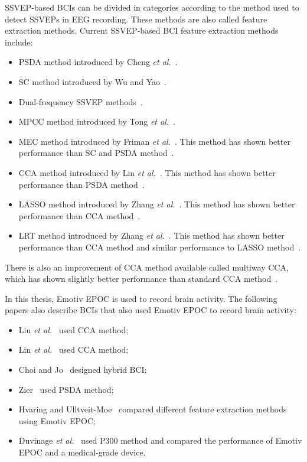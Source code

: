 \gls{SSVEP}-based \glspl{BCI} can be divided in categories according to the method used to detect \glspl{SSVEP} in \gls{EEG} recording. These methods are also called \gls{feature extraction} methods. Current \gls{SSVEP}-based \gls{BCI} \gls{feature extraction} methods include:
\begin{itemize}
	\item \Gls{PSDA} method introduced by Cheng \textit{et al.}~\cite{psda}.
	\item \Gls{SC} method introduced by Wu and Yao~\cite{sc}.
	\item Dual-frequency \gls{SSVEP} methods~\cite{dual1, dual2}.
	\item \Gls{MPCC} method introduced by Tong \textit{et al.}~\cite{MPCC}.
	\item \Gls{MEC} method introduced by Friman \textit{et al.}~\cite{mec}. This method has shown better performance than \gls{SC} and \gls{PSDA} method~\cite{mec_comparison}.
	\item \Gls{CCA} method introduced by Lin \textit{et al.}~\cite{cca_lin}. This method has shown better performance than \gls{PSDA} method~\cite{cca_psda, bin2009cca, cca_lin}.
	\item \Gls{LASSO} method introduced by Zhang \textit{et al.}~\cite{LASSO}. This method has shown better performance than \gls{CCA} method~\cite{LASSO}.
	\item \Gls{LRT} method introduced by Zhang \textit{et al.}~\cite{LRT}. This method has shown better performance than \gls{CCA} method and similar performance to \gls{LASSO} method~\cite{LRT}.
\end{itemize}
There is also an improvement of \gls{CCA} method available called multiway \gls{CCA}, which has shown slightly better performance than standard \gls{CCA} method~\cite{mcca}.

In this thesis, Emotiv EPOC is used to record brain activity. The following papers also describe \glspl{BCI} that also used Emotiv EPOC to record brain activity:
\begin{itemize}
	\item Liu \textit{et al.}~\cite{emotiv_11hz} used \gls{CCA} method;
	\item Lin \textit{et al.}~\cite{emotiv_walking} used \gls{CCA} method;
	\item Choi and Jo~\cite{emotiv_hybrid} designed hybrid \gls{BCI};
	\item Zier~\cite{emotiv_psda} used \gls{PSDA} method;
	\item Hvaring and Ulltveit-Moe~\cite{emotiv_comparison} compared different \gls{feature extraction} methods using Emotiv EPOC;
	\item Duvinage \textit{et al.}~\cite{emotiv_p300_comp} used P300 method and compared the performance of Emotiv EPOC and a medical-grade device.
\end{itemize}


